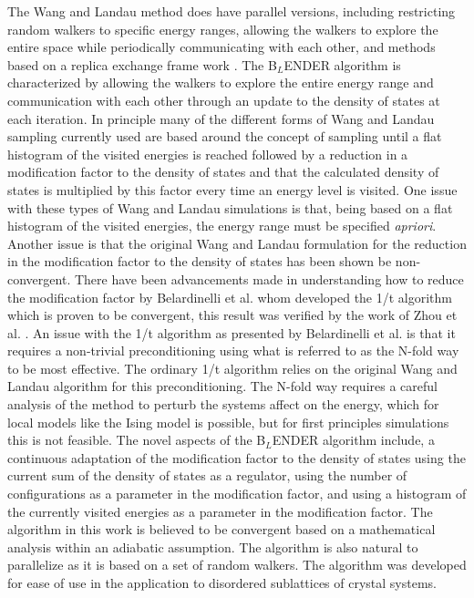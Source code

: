 \documentclass[aps,pre,reprint,superscriptaddress,showkeys]{revtex4-2}
\begin{document}
    The Wang and Landau method does have parallel versions, including  restricting random walkers to specific energy ranges, allowing the walkers to explore the entire space while periodically communicating with each other, and methods based on a replica exchange frame work \cite{MP_Wang_Landau,P_imp_Wang_Landau, Hframe_Wang_Landau, Scalable_replica_exchange}.  The B$_{L}$ENDER algorithm is characterized by allowing the walkers to explore the entire energy range and communication with each other through an update to the density of states at each iteration.  In principle many of the different forms of  Wang and Landau sampling currently used are based around the concept of sampling until a flat histogram of the visited energies is reached followed by a reduction in a modification factor to the density of states and that the calculated density of states  is multiplied by this factor every time an energy level  is visited.  One issue with these types of Wang and Landau simulations is that, being based on a flat histogram of the visited energies, the energy range must be specified \textit{apriori}. Another issue is that the original Wang and Landau formulation for the reduction in the modification factor to the  density of states has been shown be non-convergent\cite{Non_convergent_WL,Non_convergent_WL_2,non_convergence_multiple_random_walkers,Optimal_modification}.   There have been advancements made in understanding how to reduce the modification factor by Belardinelli et al. \cite{saturation} whom developed the 1/t algorithm which is proven to be convergent, this result was verified by the work of Zhou et al. \cite{Optimal_modification}. An issue with the 1/t algorithm as presented by Belardinelli et al. is that it requires a non-trivial preconditioning using what is referred to as the N-fold way to be most effective. The ordinary 1/t algorithm relies on the original Wang and Landau algorithm for this preconditioning. The N-fold way requires a careful analysis of the  method to perturb the systems affect on the energy, which for local models like the Ising model is possible, but for first principles simulations this is not feasible. The novel aspects of the B$_{L}$ENDER algorithm include, a continuous adaptation of the modification factor to the  density of states using the current sum of the density of states as a regulator, using the number of configurations as a parameter in the modification factor, and using a histogram of the currently visited energies as a parameter in the modification factor.  The algorithm in this work is believed to be convergent based on a mathematical analysis within an adiabatic assumption. The algorithm is also natural to parallelize as it is based on a set of random walkers. The algorithm was developed for ease of use in the application to disordered sublattices of crystal systems. 
\end{document}
